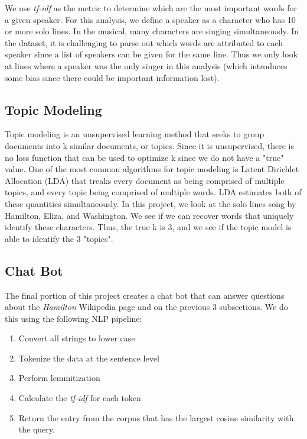 \documentclass{article}
\begin{document}
We use \emph{tf-idf} as the metric to determine which are the most important words for a given speaker. For this analysis, we define a speaker as a character who has 10 or more solo lines. In the musical, many characters are singing simultaneously. In the dataset, it is challenging to parse out which words are attributed to each speaker since a list of speakers can be given for the same line. Thus we only look at lines where a speaker was the only singer in this analysis (which introduces some bias since there could be important information lost). 

\subsection{Topic Modeling}

Topic modeling is an unsupervised learning method that seeks to group documents into k similar documents, or topics. Since it is unsupervised, there is no loss function that can be used to optimize k since we do not have a "true" value. One of the most common algorithms for topic modeling is Latent Dirichlet Allocation (LDA) that treaks every document as being comprised of multiple topics, and every topic being comprised of multiple words. LDA estimates both of these quantities simultaneously. In this project, we look at the solo lines song by Hamilton, Eliza, and Washington. We see if we can recover words that uniquely identify these characters. Thus, the true k is 3, and we see if the topic model is able to identify the 3 "topics".

\subsection{Chat Bot}

The final portion of this project creates a chat bot that can answer questions about the \emph{Hamilton} Wikipedia page and on the previous 3 subsections. We do this using the following NLP pipeline:
\begin{singlespace}
\begin{enumerate}
 \item Convert all strings to lower case
 \item Tokenize the data at the sentence level
 \item Perform lemmitization
 \item Calculate the \emph{tf-idf} for each token
 \item Return the entry from the corpus that has the largest cosine similarity with the query. 
\end{enumerate}
\end{singlespace}
\end{document}
